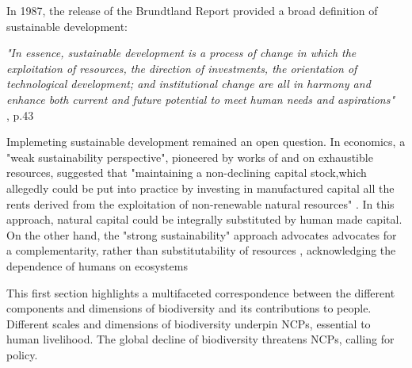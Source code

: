 \begin{tcolorbox}[breakable, 
colback=verylightgray, 
colframe=gray!75!black, 
title= {Box 1 - Weak v. Strong Sustainability},
fontupper=\small]
\par %
\justifying %

In 1987, the release of the Brundtland Report \citep{brundtland} provided a broad definition of sustainable development: 

\begin{displayquote}
\textit{"In essence, sustainable development is a process of change in which the exploitation of
resources, the direction of investments, the orientation of technological development; and institutional change are all in harmony and enhance both current and future potential to meet human needs and aspirations"}\\
\small{\cite{brundtland}, p.43}
\end{displayquote}

Implemeting sustainable development remained an open question. In economics, a "weak sustainability perspective", pioneered by works of \cite{hartwick_intergenerational_1977} and \cite{solow_intergenerational_1986} on exhaustible resources, suggested that "maintaining a non-declining capital stock,which allegedly could be put into practice by investing in manufactured capital all the rents derived from the exploitation of non-renewable natural resources" \citep{gomez_history_2010}. In this approach, natural capital could be integrally substituted by human made capital. On the other hand, the "strong sustainability" approach advocates advocates for a complementarity, rather than substitutability of resources \citep{costanza_daly}, acknowledging the dependence of humans on ecosystems
\end{tcolorbox}

This first section highlights a multifaceted correspondence between the different components and dimensions of biodiversity and its contributions to people. Different scales and dimensions of biodiversity underpin NCPs, essential to human livelihood. The global decline of biodiversity threatens NCPs, calling for policy.



